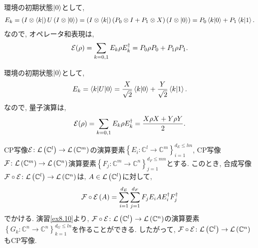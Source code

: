 \begin{ex}
    \label{ex8.4}
    環境の初期状態$\ket{0}$として,
    \begin{align*}
        E_k
        = \left(I \otimes \bra{k}\right)   U  \left(I \otimes \ket{0}\right)
        =
        \left(I \otimes \bra{k}\right)
        \left( P_0 \otimes I + P_1 \otimes X  \right)
        \left(I \otimes \ket{0}\right)
        = P_0 \braket{k|0} + P_1 \braket{k|1}.
    \end{align*}
    なので, オペレータ和表現は,
    \begin{align*}
        \mathcal{E} (\rho)
        = \sum_{k = 0, 1} E_k \rho E_k^\dagger
        = P_0 \rho P_0 + P_1 \rho P_1.
    \end{align*}
\end{ex}

\begin{ex}
    \label{ex8.5}
    環境の初期状態$\ket{0}$として,
    \begin{align*}
        E_k
        = \braket{k | U | 0}
        = \frac{X}{\sqrt{2}} \braket{k|0} + \frac{Y}{\sqrt{2}} \braket{k|1}.
    \end{align*}
    なので, 量子演算は,
    \begin{align*}
        \mathcal{E} (\rho)
        = \sum_{k = 0, 1} E_k \rho E_k^\dagger
        = \frac{X \rho X + Y \rho Y}{2}.
    \end{align*}
\end{ex}

\begin{ex}
    \label{ex8.6}
    \par
    CP写像$\mathcal{E} \colon \mathcal{L}\left({\mathbb{C}^l}\right) \to \mathcal{L}\left({\mathbb{C}^m}\right)$の演算要素$\left\{E_i \colon \mathbb{C}^l \to \mathbb{C}^m \right\}_{i=1}^{d_E \le lm}$, CP写像$\mathcal{F} \colon \mathcal{L}\left({\mathbb{C}^m}\right) \to \mathcal{L}\left({\mathbb{C}^n}\right)$演算要素$\left\{F_j \colon \mathbb{C}^m \to \mathbb{C}^n \right\}_{j=1}^{d_F \le mn}$とする. このとき, 合成写像$\mathcal{F} \circ \mathcal{E} \colon \mathcal{L}\left({\mathbb{C}^l}\right) \to \mathcal{L}\left({\mathbb{C}^n}\right)$は, $A \in \mathcal{L}\left({\mathbb{C}^l}\right)$に対して,
    \begin{align*}
        \mathcal{F} \circ \mathcal{E} \left( A\right)
        =
        \sum_{i = 1}^{d_E}\sum_{j=1}^{d_F}
        F_j E_i A E_i^\dagger F_j^\dagger
    \end{align*}
    でかける. 演習\ref{ex8.10}より, $\mathcal{F} \circ \mathcal{E} \colon \mathcal{L}\left({\mathbb{C}^l}\right) \to \mathcal{L}\left({\mathbb{C}^n}\right)$の演算要素$\left\{G_k \colon \mathbb{C}^n \to \mathbb{C}^n \right\}_{k=1}^{d_G \le ln}$を作ることができる. したがって, $\mathcal{F} \circ \mathcal{E} \colon \mathcal{L}\left({\mathbb{C}^l}\right) \to \mathcal{L}\left({\mathbb{C}^n}\right)$もCP写像.
\end{ex}

